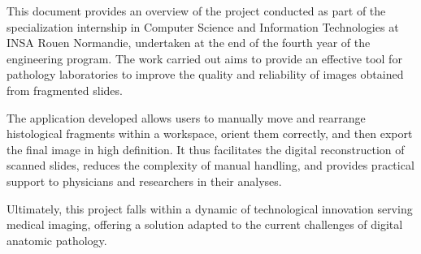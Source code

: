 \documentclass[12pt,a4paper]{report}
\begin{document}
This document provides an overview of the project conducted as part of the specialization internship in Computer Science and Information Technologies at INSA Rouen Normandie, undertaken at the end of the fourth year of the engineering program. The work carried out aims to provide an effective tool for pathology laboratories to improve the quality and reliability of images obtained from fragmented slides.

The application developed allows users to manually move and rearrange histological fragments within a workspace, orient them correctly, and then export the final image in high definition. It thus facilitates the digital reconstruction of scanned slides, reduces the complexity of manual handling, and provides practical support to physicians and researchers in their analyses.

Ultimately, this project falls within a dynamic of technological innovation serving medical imaging, offering a solution adapted to the current challenges of digital anatomic pathology.
\end{document}
